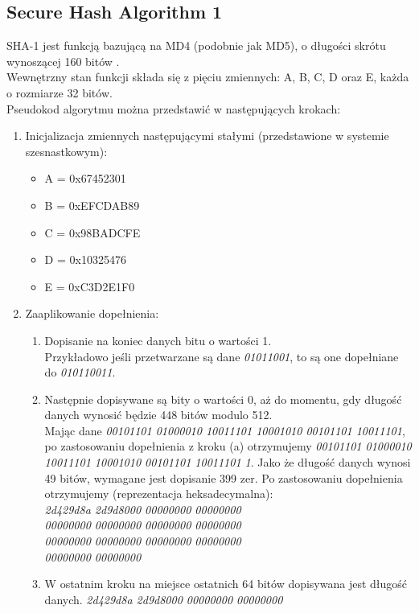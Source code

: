 \subsection{Secure Hash Algorithm 1}
SHA-1 jest funkcją bazującą na MD4 (podobnie jak MD5), o długości skrótu wynoszącej 160 bitów \cite{cryptoirf}. \\
Wewnętrzny stan funkcji składa się z pięciu zmiennych: A, B, C, D oraz E, każda o rozmiarze 32 bitów. \\
Pseudokod algorytmu można przedstawić w następujących krokach:
\begin{enumerate}
	\item Inicjalizacja zmiennych następującymi stałymi (przedstawione w systemie szesnastkowym):
		\begin{itemize}
			\item A = 0x67452301
			\item B = 0xEFCDAB89
			\item C = 0x98BADCFE
			\item D = 0x10325476
			\item E = 0xC3D2E1F0
		\end{itemize}
	\item Zaaplikowanie dopełnienia:
		\begin{enumerate}
			\item Dopisanie na koniec danych bitu o wartości 1. \\ 
			Przykładowo jeśli przetwarzane są dane \textit{01011001}, to są one dopełniane do \textit{010110011}.
			\item Następnie dopisywane są bity o wartości 0, aż do momentu, gdy długość danych wynosić będzie 448 bitów modulo 512. \\
			Mając dane \textit{00101101 01000010 10011101 10001010 00101101 10011101}, po zastosowaniu dopełnienia z kroku (a) otrzymujemy \textit{00101101 01000010 10011101 10001010 00101101 10011101 1}. Jako że długość danych wynosi 49 bitów, wymagane jest dopisanie 399 zer. Po zastosowaniu dopełnienia otrzymujemy (reprezentacja heksadecymalna): \\
			\textit{2d429d8a 2d9d8000 00000000 00000000 \\ 
					00000000 00000000 00000000 00000000 \\ 
					00000000 00000000 00000000 00000000 \\ 
					00000000 00000000 }
			\item W ostatnim kroku na miejsce ostatnich 64 bitów dopisywana jest długość danych. 
			\textit{2d429d8a 2d9d8000 00000000 00000000 \\ 
}
\end{enumerate}
\end{enumerate}
